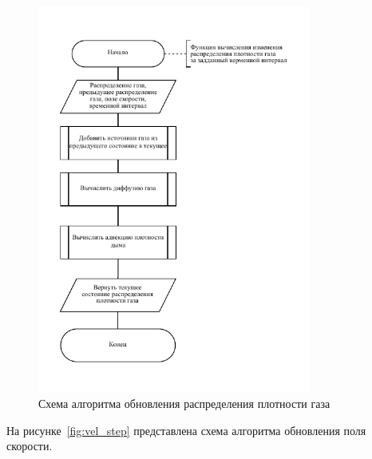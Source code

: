 \begin{figure}[H]
	\centering
	\includegraphics[width=0.8\textwidth, page=1]{assets/img/dens_step.pdf}   
	\caption{Схема алгоритма обновления распределения плотности газа}
	\label{fig:dens_step}
\end{figure}

На рисунке~\ref{fig:vel_step} представлена схема алгоритма обновления поля скорости.

